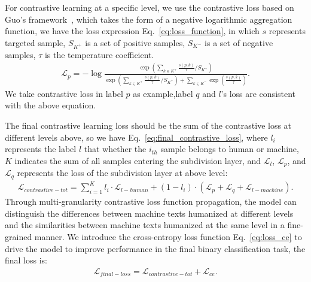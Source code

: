 \documentclass[11pt]{article}
\newcommand{\greenCitep}[1]{\textcolor{darkgreen}{\citep{#1}}}
\begin{document}
    For contrastive learning at a specific level, we use the contrastive loss based on Guo's framework~\greenCitep{guo2024detective}, which takes the form of a negative logarithmic aggregation function, we have the loss expression Eq.~\ref{eq:loss_function}, in which $s$ represents targeted sample, $S_{K^+}$ is a set of positive samples, $S_{K^-}$ is a set of negative samples, $\tau$ is the temperature coefficient.
    \begin{equation}
      \begin{aligned}
          \label{eq:loss_function}
           \mathcal L_p= -\log \frac{\exp \left( \sum_{k \in K^+} \frac{s(p, k)}{\tau} / S_{K^+} \right)}{\exp \left( \sum_{k \in K^+} \frac{s(p, k)}{\tau} / S_{K^+} \right) + \sum_{k \in K^-} \exp \left( \frac{s(p, k)}{\tau} \right)}.
      \end{aligned}
      \end{equation}
    We take contrastive loss in label $p$ as example,label $q$ and $l$'s loss are consistent with the above equation.

    The final contrastive learning loss should be the sum of the contrastive loss at different levels above, so we have Eq.~\ref{eq:final_contrastive_loss}, where $l_i$ represents the label $l$ that whether the $i_{th}$ sample belongs to human or machine, $K$ indicates the sum of all samples entering the subdivision layer, and $\mathcal L_l$, $\mathcal L_p$, and $\mathcal L_q$ represents the loss of the subdivision layer at above level:
    \begin{equation}
      \begin{aligned}
      \label{eq:final_contrastive_loss}
      \mathcal L_{contrastive-tot} = \displaystyle\sum_{i=1}^K l_i \cdot \mathcal L_{l-human} + (1 - l_i) \cdot (\mathcal L_p + \mathcal L_q + \mathcal L_{l-machine} ).
      \end{aligned}
  \end{equation}
  Through multi-granularity contrastive loss function propagation, the model can distinguish the differences between machine texts humanized at different levels and the similarities between machine texts humanized at the same level in a fine-grained manner. We introduce the cross-entropy loss function Eq.~\ref{eq:loss_ce} to drive the model to improve performance in the final binary classification task, the final loss is:
  \begin{equation}
    \begin{aligned}
        \label{eq:loss_overall}
        \mathcal L_{final-loss}=\mathcal L_{contrastive-tot} + \mathcal L_{ce}.
    \end{aligned}
    \end{equation}
\end{document}
